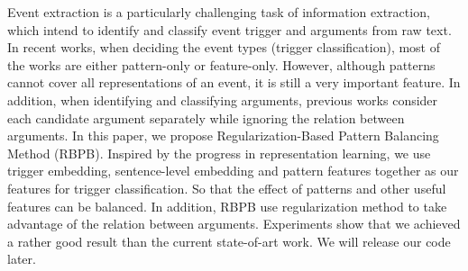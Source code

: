 Event extraction is a particularly challenging task of information extraction, which intend to identify and classify event trigger and arguments from raw text. In recent works, when deciding the event types (trigger classification), most of the works are either pattern-only  or feature-only. However, although patterns cannot cover all representations of an event, it is still a very important feature. In addition, when identifying and classifying arguments, previous works consider each candidate argument separately while ignoring the relation between arguments. In this paper, we propose Regularization-Based Pattern Balancing Method (RBPB). Inspired by the progress in representation learning, we use trigger embedding, sentence-level embedding and pattern features together as our features for trigger classification. So that the effect of patterns and other useful features can be balanced. In addition, RBPB use regularization method to take advantage of the relation between arguments. Experiments show that we achieved a rather good result than the current state-of-art work. We will release our code later.
